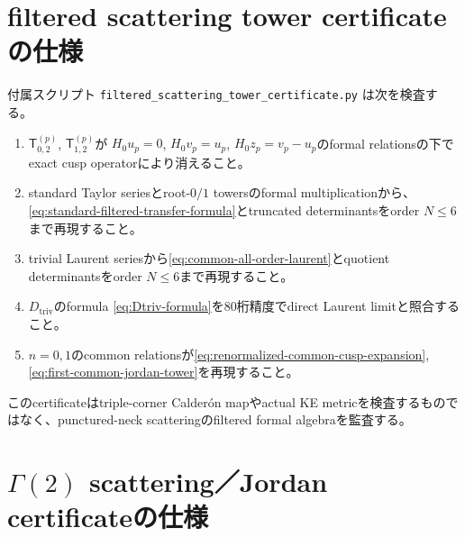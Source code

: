 \documentclass[11pt,a4paper]{ltjsarticle}
\theoremstyle{definition}
\theoremstyle{remark}
\begin{document}
\section{filtered scattering tower certificateの仕様}
付属スクリプト
\texttt{filtered\_scattering\_tower\_certificate.py}
は次を検査する。
\begin{enumerate}[leftmargin=2.5em]
\item $\mathsf T_{0,2}^{(p)}$, $\mathsf T_{1,2}^{(p)}$が
$H_0u_p=0$, $H_0v_p=u_p$, $H_0z_p=v_p-u_p$のformal relationsの下でexact cusp operatorにより消えること。
\item standard Taylor seriesとroot-$0/1$ towersのformal multiplicationから、\eqref{eq:standard-filtered-transfer-formula}とtruncated determinantsをorder $N\le6$まで再現すること。
\item trivial Laurent seriesから\eqref{eq:common-all-order-laurent}とquotient determinantsをorder $N\le6$まで再現すること。
\item $D_{\mathrm{triv}}$のformula \eqref{eq:Dtriv-formula}を80桁精度でdirect Laurent limitと照合すること。
\item $n=0,1$のcommon relationsが\eqref{eq:renormalized-common-cusp-expansion}, \eqref{eq:first-common-jordan-tower}を再現すること。
\end{enumerate}
このcertificateはtriple-corner Calder\'on mapやactual KE metricを検査するものではなく、punctured-neck scatteringのfiltered formal algebraを監査する。

\section{$\Gamma(2)$ scattering／Jordan certificateの仕様}
\end{document}
